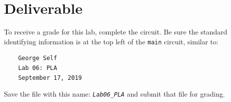 \section{Deliverable}

To receive a grade for this lab, complete the circuit. Be sure the standard identifying information is at the top left of the \lstinline[columns=fixed]|main| circuit, similar to: 

\bigskip
\begin{minipage}{\linewidth}
	\begin{verbatim}
	George Self
	Lab 06: PLA
	September 17, 2019
	\end{verbatim}
\end{minipage}
\bigskip

Save the file with this name: \emph{\texttt{Lab06\_PLA}} and submit that file for grading.

